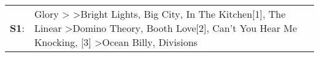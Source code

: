 \begin{supertabular}{p{0.03\textwidth}p{0.92\textwidth}}
 \textbf{S1}:  &  Glory\textsuperscript{} \textgreater {}\textsuperscript{} \textgreater \enspace Bright Lights, Big City\textsuperscript{}, \enspace In The Kitchen[1]\textsuperscript{}, \enspace The Linear\textsuperscript{} \textgreater \enspace Domino Theory\textsuperscript{}, \enspace Booth Love[2]\textsuperscript{}, \enspace Can't You Hear Me Knocking\textsuperscript{}, [3]\textsuperscript{} \textgreater \enspace Ocean Billy\textsuperscript{}, \enspace Divisions\textsuperscript{}  \enspace  \\
\end{supertabular}
